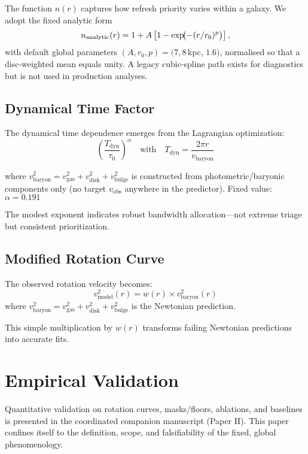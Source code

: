 \documentclass[usenatbib]{mnras}
\begin{document}
The function $n(r)$ captures how refresh priority varies within a galaxy. We adopt the fixed analytic form
\begin{equation}
n_{\rm analytic}(r) = 1 + A\left[1 - \exp\!\bigl(-(r/r_0)^p\bigr)\right],
\end{equation}
with default global parameters $(A, r_0, p) = (7, 8$\,kpc, $1.6)$, normalised so that a disc-weighted mean equals unity. A legacy cubic-spline path exists for diagnostics but is not used in production analyses.

\subsection{Dynamical Time Factor}

The dynamical time dependence emerges from the Lagrangian optimization:
\begin{equation}
\left(\frac{T_{\text{dyn}}}{\tau_0}\right)^\alpha \quad \text{with} \quad T_{\text{dyn}} = \frac{2\pi r}{v_{\text{baryon}}}
\end{equation}

where $v_{\text{baryon}}^2 = v_{\text{gas}}^2 + v_{\text{disk}}^2 + v_{\text{bulge}}^2$ is constructed from photometric/baryonic components only (no target $v_{\text{obs}}$ anywhere in the predictor). Fixed value: $\alpha = 0.191$

The modest exponent indicates robust bandwidth allocation---not extreme triage but consistent prioritization.

\subsection{Modified Rotation Curve}

The observed rotation velocity becomes:
\begin{equation}
v_{\text{model}}^2(r) = w(r) \times v_{\text{baryon}}^2(r)
\end{equation}
where $v_{\text{baryon}}^2 = v_{\text{gas}}^2 + v_{\text{disk}}^2 + v_{\text{bulge}}^2$ is the Newtonian prediction.

This simple multiplication by $w(r)$ transforms failing Newtonian predictions into accurate fits.

\section{Empirical Validation}

Quantitative validation on rotation curves, masks/floors, ablations, and baselines is presented in the coordinated companion manuscript (Paper II). This paper confines itself to the definition, scope, and falsifiability of the fixed, global phenomenology.
\end{document}
